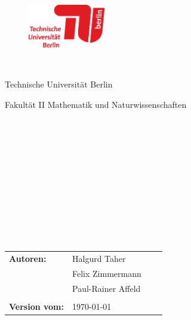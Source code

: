 


%


\thispagestyle{empty}

\begin{figure}[t]

 \includegraphics[width=0.3\textwidth]{abb/misc/TULogo.eps}
~~~~~~~~~~
\end{figure}


\begin{verbatim}


\end{verbatim}

\begin{center}
\Large{Technische Universität Berlin}\\
\end{center}


\begin{center}
\Large{Fakultät II Mathematik und Naturwissenschaften}
\end{center}
\begin{verbatim}


\end{verbatim}
\begin{center}
\doublespacing
\textbf{\LARGE{\titleDocument}}\\
\singlespacing
\begin{verbatim}

\end{verbatim}
\textbf{{~\subjectDocument}}
\end{center}
\begin{verbatim}

\end{verbatim}
\begin{center}

\end{center}
\begin{verbatim}





\end{verbatim}
\begin{flushleft}
\begin{tabular}{llll}
\textbf{Autoren:} &  Halgurd Taher &\\& Felix Zimmermann& \\
&  Paul-Rainer Affeld & \\
& & \\
\textbf{Version vom:}  & \today &
\end{tabular}
\end{flushleft}
